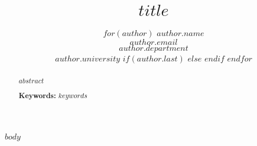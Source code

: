 \documentclass[10pt, letterpaper]{article}
\title{$title$}
\author{
  $for(author)$
    {\large \bf $author.name$} \\
    $author.email$ \\
    $author.department$ \\
    $author.university$
    $if(author.last)$
    $else$
    \And
    $endif$
  $endfor$
}
\begin{document}
\maketitle

\begin{abstract}
$abstract$

\textbf{Keywords:}
$keywords$
\end{abstract}

$body$



\end{document}
